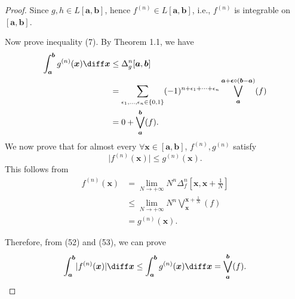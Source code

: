 \documentclass{ijclclp}
\begin{document}
\begin{proof}
    Since \(g,h\in L[\boldsymbol{a},\boldsymbol{b}]\), hence \(f^{(n)}\in L[\boldsymbol{a},\boldsymbol{b}]\), i.e., \(f^{(n)}\) is integrable on \([\boldsymbol{a},\boldsymbol{b}]\).

    Now prove inequality (7). By Theorem 1.1, we have
    \begin{equation}
        \begin{aligned}[b]
            \int_{\boldsymbol{a}}^{\boldsymbol{b}}g^{(n)}(\boldsymbol{x})\diff \boldsymbol{x}&\leq\Delta_g^n[\boldsymbol{a},\boldsymbol{b}]\\
            &=\sum_{\epsilon_1,\dots,\epsilon_n\in\{0,1\}}(-1)^{n+\epsilon_1+\dots+\epsilon_n}\bigvee_{\boldsymbol{a}}^{\boldsymbol{a}+\boldsymbol{\epsilon}\circ(\boldsymbol{b}-\boldsymbol{a})}(f)\\
            &=0+\bigvee_{\boldsymbol{a}}^{\boldsymbol{b}}(f).    
        \end{aligned}
    \end{equation}
    We now prove that for almost every \(\forall\boldsymbol{x}\in[\boldsymbol{a},\boldsymbol{b}]\), \(f^{(n)},g^{(n)}\) satisfy
    \begin{equation}
        \lvert f^{(n)}(\boldsymbol{x})\rvert\leq g^{(n)}(\boldsymbol{x}).
    \end{equation}
    This follows from
    \begin{align*}
        f^{(n)}(\boldsymbol{x})&=\lim_{N\to+\infty}N^n\Delta_f^n[\boldsymbol{x},\boldsymbol{x}+\frac{1}{N}]\\
        &\leq\lim_{N\to+\infty}N^n\bigvee_{\boldsymbol{x}}^{\boldsymbol{x}+\frac{1}{N}}(f)\\
        &=g^{(n)}(\boldsymbol{x}).
    \end{align*}

    Therefore, from (52) and (53), we can prove
    \[\int_{\boldsymbol{a}}^{\boldsymbol{b}}\lvert f^{(n)}(\boldsymbol{x})\rvert\diff \boldsymbol{x}\leq\int_{\boldsymbol{a}}^{\boldsymbol{b}}g^{(n)}(\boldsymbol{x})\diff \boldsymbol{x}=\bigvee_{\boldsymbol{a}}^{\boldsymbol{b}}(f).\]
\end{proof}
\end{document}
